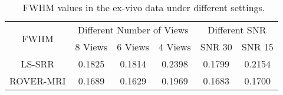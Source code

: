 \documentclass[AMA,STIX2COL]{MRM}
\begin{document}
\begin{table*}[h]
\caption{~FWHM values in the ex-vivo data under different settings.}
\label{tab3}
\centering
\begin{tabular}{c|ccc||cc}
\hline
\multirow{2}{*}{FWHM} & \multicolumn{3}{c||}{Different Number of Views} & \multicolumn{2}{c}{Different SNR} \\ \cline{2-6} 
                      & 8 Views        & 6 Views       & 4 Views       & SNR 30           & SNR 15         \\ \hline
LS-SRR                   & 0.1825         & 0.1814        & 0.2398        & 0.1799           & 0.2154         \\
ROVER-MRI             & 0.1689         & 0.1629        & 0.1969        & 0.1683           & 0.1700         \\
\hline
\end{tabular}
\end{table*}
\end{document}

